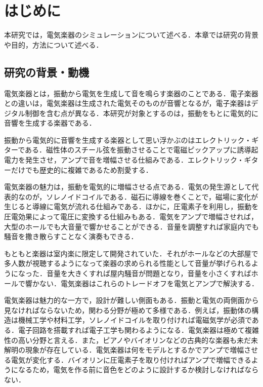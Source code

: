 \section{はじめに}

本研究では，電気楽器のシミュレーションについて述べる．本章では研究の背景や目的，方法について述べる．

\subsection{研究の背景・動機}

電気楽器とは，振動から電気を生成して音を鳴らす楽器のことである．電子楽器との違いは，電気楽器は生成された電気そのものが音響となるが，電子楽器はデジタル制御を含む点が異なる．本研究が対象とするのは，振動をもとに電気的に音響を生成する楽器である．

振動から電気的に音響を生成する楽器として思い浮かぶのはエレクトリック・ギターである．磁性体のスチール弦を振動させることで電磁ピックアップに誘導起電力を発生させ，アンプで音を増幅させる仕組みである．エレクトリック・ギターだけでも歴史的に複雑であるため割愛する．

電気楽器の魅力は，振動を電気的に増幅させる点である．電気の発生源として代表的なのが，ソレノイドコイルである．磁石に導線を巻くことで，磁場に変化が生じると導線に電気が流れる仕組みである．ほかに，圧電素子を利用し，振動を圧電効果によって電圧に変換する仕組みもある．電気をアンプで増幅させれば，大型のホールでも大音量で響かせることができる．音量を調整すれば家庭内でも騒音を撒き散らすことなく演奏もできる．

もともと楽器は室内楽に限定して開発されていた．それがホールなどの大部屋で多人数が視聴するようになって楽器の求められる性能として音量が挙げられるようになった．音量を大きくすれば屋内騒音が問題となり，音量を小さくすればホールで響かない．電気楽器はこれらのトレードオフを電気とアンプで解決する．

電気楽器は魅力的な一方で，設計が難しい側面もある．振動と電気の両側面から見なければならないため，関わる分野が極めて多様である．例えば，振動体の構造は機械工学や材料工学，ソレノイドコイルを取り付ければ電磁気学が必須である．電子回路を搭載すれば電子工学も関わるようになる．電気楽器は極めて複雑性の高い分野と言える．また，ピアノやバイオリンなどの古典的な楽器も未だ未解明の現象が存在している．電気楽器は何をモデルとするかでアンプで増幅させる電気が変化する．バイオリンに圧電素子を取り付ければアンプで増幅できるようになるため，電気を作る前に音色をどのように設計するか検討しなければならない．


